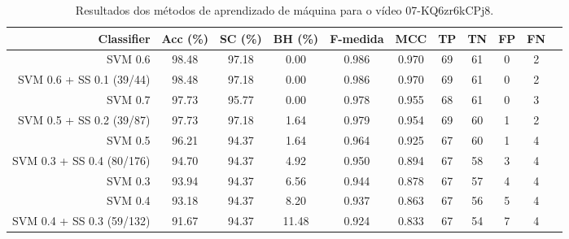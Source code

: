 \begin{table}[!htb]
\centering
\caption{Resultados dos métodos de aprendizado de máquina para o vídeo 07-KQ6zr6kCPj8.}
\label{tab:07-KQ6zr6kCPj8}
\begin{tabular}{r|c|c|c|c|c|c|c|c|c|c}
\hline\hline
Classifier & Acc (\%) & SC (\%) & BH (\%) & F-medida & MCC & TP & TN & FP & FN \\ \hline
SVM 0.6 & 98.48 & 97.18 & 0.00 & 0.986 & 0.970 & 69 & 61 & 0 & 2 \\ 
SVM 0.6 + SS 0.1 (39/44) & 98.48 & 97.18 & 0.00 & 0.986 & 0.970 & 69 & 61 & 0 & 2 \\ 
SVM 0.7 & 97.73 & 95.77 & 0.00 & 0.978 & 0.955 & 68 & 61 & 0 & 3 \\ 
SVM 0.5 + SS 0.2 (39/87) & 97.73 & 97.18 & 1.64 & 0.979 & 0.954 & 69 & 60 & 1 & 2 \\ 
SVM 0.5 & 96.21 & 94.37 & 1.64 & 0.964 & 0.925 & 67 & 60 & 1 & 4 \\ 
SVM 0.3 + SS 0.4 (80/176) & 94.70 & 94.37 & 4.92 & 0.950 & 0.894 & 67 & 58 & 3 & 4 \\ 
SVM 0.3 & 93.94 & 94.37 & 6.56 & 0.944 & 0.878 & 67 & 57 & 4 & 4 \\ 
SVM 0.4 & 93.18 & 94.37 & 8.20 & 0.937 & 0.863 & 67 & 56 & 5 & 4 \\ 
SVM 0.4 + SS 0.3 (59/132) & 91.67 & 94.37 & 11.48 & 0.924 & 0.833 & 67 & 54 & 7 & 4 \\ 
\hline\hline
\end{tabular}
\end{table}
